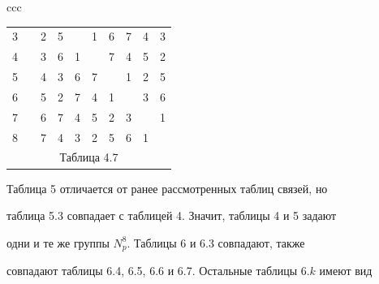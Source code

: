 \begin{center}
\begin{tabular}{ccc}
\begin{tabular}{cccccccccc}
3 & \vline & 2 & 5 & \ & 1 & 6 & 7 & 4 & 3 \\


4 & \vline & 3 & 6 & 1 & \ & 7 & 4 & 5 & 2 \\


5 & \vline & 4 & 3 & 6 & 7 & \ & 1 & 2 & 5 \\


6 & \vline & 5 & 2 & 7 & 4 & 1 & \ & 3 & 6 \\


7 & \vline & 6 & 7 & 4 & 5 & 2 & 3 & \ & 1 \\


8 & \vline & 7 & 4 & 3 & 2 & 5 & 6 & 1 & \ \\


\multicolumn{10}{c}{ Таблица 4.7}


\end{tabular}





\end{tabular}


\end{center}


\smallskip





\noindent{}Таблица 5 отличается от ранее рассмотренных таблиц связей, но


таблица 5.3 совпадает с таблицей 4. Значит, таблицы 4 и 5 задают


одни и те же группы $N^8_p$. Таблицы 6 и 6.3 совпадают, также 


совпадают таблицы 6.4, 6.5, 6.6 и 6.7. Остальные таблицы $6.k$ имеют вид


\smallskip





